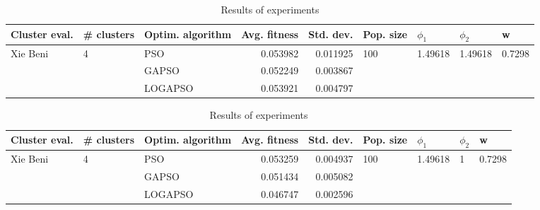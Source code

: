 \documentclass{article}
\begin{document}
\begin{table}
\centering
\caption{Results of experiments}
\begin{tabular}{lllrrllll}
\toprule
            Cluster eval. &        \# clusters & Optim. algorithm &  Avg. fitness &  Std. dev. &            Pop. size &               $\phi_{1}$ &               $\phi_{2}$ &                       w \\
\midrule
\multirow{3}{*}{Xie Beni} & \multirow{3}{*}{4} &              PSO &      0.053982 &   0.011925 & \multirow{3}{*}{100} & \multirow{3}{*}{1.49618} & \multirow{3}{*}{1.49618} & \multirow{3}{*}{0.7298} \\
                          &                    &            GAPSO &      0.052249 &   0.003867 &                      &                          &                          &                         \\
                          &                    &          LOGAPSO &      0.053921 &   0.004797 &                      &                          &                          &                         \\
\bottomrule
\end{tabular}
\end{table}
\begin{table}
\centering
\caption{Results of experiments}
\begin{tabular}{lllrrllll}
\toprule
            Cluster eval. &        \# clusters & Optim. algorithm &  Avg. fitness &  Std. dev. &            Pop. size &               $\phi_{1}$ &         $\phi_{2}$ &                       w \\
\midrule
\multirow{3}{*}{Xie Beni} & \multirow{3}{*}{4} &              PSO &      0.053259 &   0.004937 & \multirow{3}{*}{100} & \multirow{3}{*}{1.49618} & \multirow{3}{*}{1} & \multirow{3}{*}{0.7298} \\
                          &                    &            GAPSO &      0.051434 &   0.005082 &                      &                          &                    &                         \\
                          &                    &          LOGAPSO &      0.046747 &   0.002596 &                      &                          &                    &                         \\
\bottomrule
\end{tabular}
\end{table}
\end{document}
